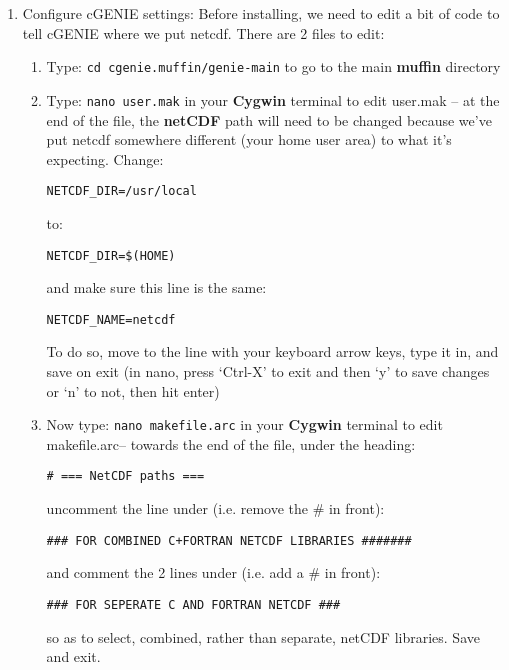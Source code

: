\documentclass[11pt,fleqn]{book} %
\begin{document}
\begin{enumerate}[noitemsep]
\vspace{2mm}
\item Configure cGENIE settings: Before installing, we need to edit a
  bit of code to tell cGENIE where we put netcdf. There are 2 files to
  edit:
\begin{enumerate}[noitemsep]
\vspace{1mm}
\item Type: \texttt{cd cgenie.muffin/genie-main} to go to the main \textbf{muffin} directory
\vspace{1mm}
\item Type: \texttt{nano user.mak} in your \textbf{Cygwin} terminal to
  edit \textsf{\small user.mak} – at the end of the file, the
  \textbf{netCDF} path will need to be changed because we’ve put
  netcdf somewhere different (your home user area) to what it’s
  expecting. Change:
\begin{verbatim}
NETCDF_DIR=/usr/local
\end{verbatim}
to:
\begin{verbatim}
NETCDF_DIR=$(HOME)
\end{verbatim}
and make sure this line is the same:
\begin{verbatim}
NETCDF_NAME=netcdf
\end{verbatim}
To do so, move to the line with your keyboard arrow keys, type it in,
and save on exit (in nano, press ‘Ctrl-X’ to exit and then ‘y’ to save
changes or ‘n’ to not, then hit enter)
\vspace{1mm}
\item Now type: \texttt{nano makefile.arc} in your \textbf{Cygwin}
  terminal to edit \textsf{\small makefile.arc}– towards the end of
  the file, under the heading:
\begin{verbatim}
# === NetCDF paths ===
\end{verbatim}
uncomment the line under (i.e. remove the \# in front):
\begin{verbatim}
### FOR COMBINED C+FORTRAN NETCDF LIBRARIES #######
\end{verbatim}
and comment the 2 lines under (i.e. add a \# in front):
\begin{verbatim}
### FOR SEPERATE C AND FORTRAN NETCDF ###
\end{verbatim}
so as to select, combined, rather than separate, netCDF
libraries. Save and exit.
\end{enumerate}


\end{enumerate}
\end{document}
